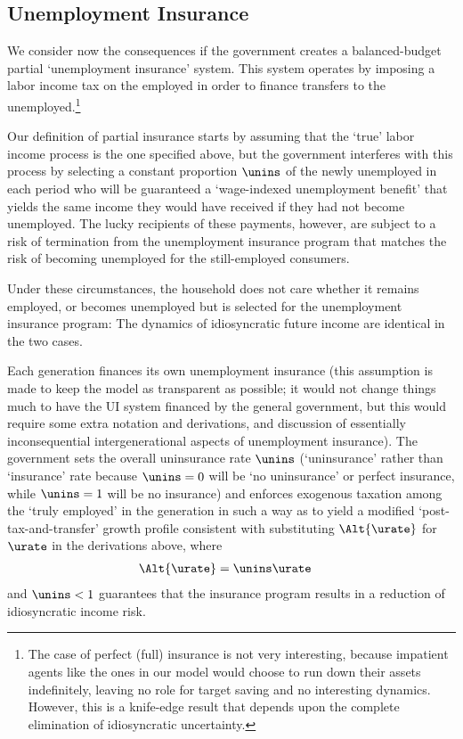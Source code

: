 \documentclass{\handout}
\begin{document}
\begin{CDCPrivate}
\subsection{Unemployment Insurance}

We consider now the consequences if the government creates a balanced-budget 
partial `unemployment insurance' system.  This system operates by 
imposing a labor income tax on the employed in order to finance transfers to 
the unemployed.\footnote{
The case of perfect (full) insurance is not very interesting,
because impatient agents like the ones in our model would choose to run
down their assets indefinitely, leaving no role for target saving and
no interesting dynamics.  However, this is a knife-edge result that
depends upon the complete elimination of idiosyncratic uncertainty.}

Our definition of partial insurance starts by assuming that the `true'
labor income process is the one specified above, but the government
interferes with this process by selecting a constant proportion
$\unins$ of the newly unemployed in each period who will be guaranteed a
`wage-indexed unemployment benefit' that yields the same income they
would have received if they had not become unemployed.  The lucky recipients
of these payments, however, are subject to a risk of termination from
the unemployment insurance program that matches the risk of becoming unemployed for the
still-employed consumers.  

Under these circumstances, the household does not care whether it remains employed, or becomes 
unemployed but is selected for the unemployment insurance program: The 
dynamics of idiosyncratic future income are identical in the two cases.

Each generation finances its own unemployment insurance (this
assumption is made to keep the model as transparent as possible; it
would not change things much to have the UI system financed by the
general government, but this would require some extra notation and
derivations, and discussion of essentially inconsequential
intergenerational aspects of unemployment insurance).  The government
sets the overall uninsurance rate $\unins$ (`uninsurance' rather than
`insurance' rate because $\unins=0$ will be `no uninsurance' or perfect
insurance, while $\unins=1$ will be no insurance) and enforces exogenous taxation among the `truly employed'
in the generation in such a way as to yield a modified
`post-tax-and-transfer' growth profile consistent with substituting
$\Alt{\urate}$ for $\urate$ in the derivations above, where
\begin{equation}\begin{gathered}\begin{aligned}
  \Alt{\urate} & =  \unins \urate
\end{aligned}\end{gathered}\end{equation}
and $\unins < 1$ guarantees that the insurance program results in a reduction
of idiosyncratic income risk.  


\end{CDCPrivate}
\end{document}
